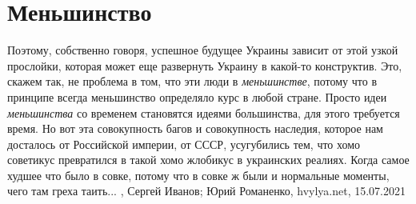  
 
 
 
 
\chapter{Меньшинство}

Поэтому, собственно говоря, успешное будущее Украины зависит от этой узкой
прослойки, которая может еще развернуть Украину в какой-то конструктив. Это,
скажем так, не проблема в том, что эти люди в \emph{меньшинстве}, потому что в
принципе всегда меньшинство определяло курс в любой стране. Просто идеи
\emph{меньшинства} со временем становятся идеями большинства, для этого
требуется время.  Но вот эта совокупность багов и совокупность наследия,
которое нам досталось от Российской империи, от СССР, усугубились тем, что хомо
советикус превратился в такой хомо жлобикус в украинских реалиях. Когда самое
худшее что было в совке, потому что в совке ж были и нормальные моменты, чего
там греха таить...
, 
Сергей Иванов; Юрий Романенко, hvylya.net, 15.07.2021

